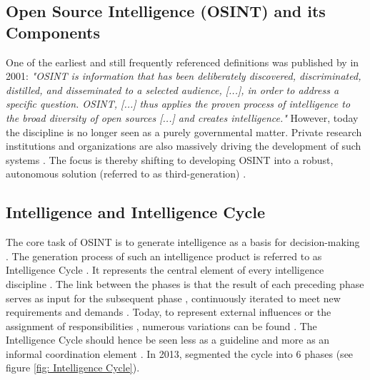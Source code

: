\documentclass[10pt]{article}
\begin{document}

\subsection{Open Source Intelligence (OSINT) and its Components}

One of the earliest and still frequently referenced definitions \cite{DosPassos.2017}
was published by \cite{NorthAtlanticTreatyOrganization.2001} in 2001: \textit{"OSINT is information that has been
    deliberately discovered, discriminated, distilled, and disseminated to a selected audience,
    [...], in order to address a specific question. OSINT, [...] thus applies the proven
    process of intelligence to the broad diversity of open sources [...] and creates
    intelligence."} However, today the discipline is no longer seen as a purely governmental
matter. Private research institutions and organizations \cite{Bohm.2021,Mercado.2005} are
also massively driving the development of such systems
\cite{Dokman.2020, Ghioni.2023}. The focus is thereby shifting to
developing OSINT into a robust, autonomous solution (referred to as third-generation) \cite{PastorGalindo.2019}.

\subsection{Intelligence and Intelligence Cycle}

The core task of OSINT is to generate intelligence
as a basis for decision-making
\cite{Breakspear.2013,NorthAtlanticTreatyOrganization.2001}. The generation process of such an intelligence product
is referred to as Intelligence Cycle \cite{CentralIntelligenceAgency.1987}.
It represents the central element of every intelligence discipline \cite{Reuser.2017}.
The link between the phases is that the result of each preceding phase serves as input for the subsequent phase \cite{JointChiefsofStaffU.S.Army.2013}, continuously iterated to meet new requirements and demands \cite{Gibson.2016}.
Today, to represent external influences or the
assignment of responsibilities \cite{Lowenthal.2020,Phythian.2013}, numerous
variations can be found \cite{Reuser.2017}. The
Intelligence Cycle should hence be seen less as a guideline and more as an informal
coordination element \cite{Hwang.2022}.
In 2013, \cite{JointChiefsofStaffU.S.Army.2013} segmented the cycle into 6 phases  (see figure \ref{fig: Intelligence Cycle}).
\end{document}
